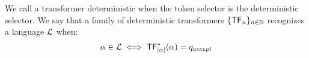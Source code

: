 
\begin{definition}
    We call a transformer deterministic when the token selector is the deterministic selector.
    We say that a family of deterministic transformers $\{\mathsf{TF}_n\}_{n \in \mathbb{N}}$ recognizes a language $\mathcal{L}$ when: 
    \[
    \alpha \in \mathcal{L} \iff \mathsf{TF}_{|\alpha|}^*(\alpha) = q_{accept}
    \]    
\end{definition}


\smallskip





